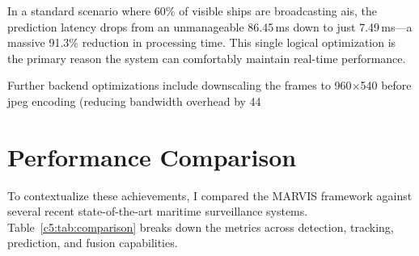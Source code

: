 In a standard scenario where 60\% of visible ships are broadcasting \gls{ais}, the prediction latency drops from an unmanageable 86.45\,ms down to just 7.49\,ms—a massive 91.3\% reduction in processing time. This single logical optimization is the primary reason the system can comfortably maintain real-time performance.

Further backend optimizations include downscaling the frames to 960$\times$540 before \gls{jpeg} encoding (reducing bandwidth overhead by 44%

\section{Performance Comparison}

To contextualize these achievements, I compared the MARVIS framework against several recent state-of-the-art maritime surveillance systems. Table~\ref{c5:tab:comparison} breaks down the metrics across detection, tracking, prediction, and fusion capabilities.

\begin{table}[H]
\fontsize{9}{11}\selectfont
\centering
\caption{Comprehensive comparison of the proposed system with prior works}
\label{c5:tab:comparison}
\end{table}

